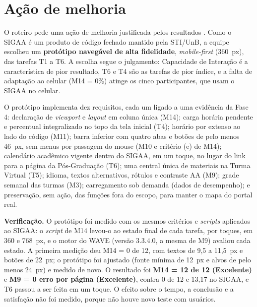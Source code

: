 \section{Ação de melhoria}
\label{sec:melhoria}

O roteiro pede uma ação de melhoria justificada pelos resultados \cite{ramos2026roteiro}. Como o SIGAA é um produto de código fechado mantido pela STI/UnB, a equipe escolheu um \textbf{protótipo navegável de alta fidelidade}, \textit{mobile-first} (360~px), das tarefas T1 a T6. A escolha segue o julgamento: Capacidade de Interação é a característica de pior resultado, T6 e T4 são as tarefas de pior índice, e a falta de adaptação ao celular (M14 = 0\%) atinge os cinco participantes, que usam o SIGAA no celular.

O protótipo implementa dez requisitos, cada um ligado a uma evidência da Fase 4: declaração de \textit{viewport} e \textit{layout} em coluna única (M14); carga horária pendente e percentual integralizado no topo da tela inicial (T4); horário por extenso ao lado do código (M11); barra inferior com quatro abas e botões de pelo menos 46~px, sem menus por passagem do mouse (M10 e critério (e) de M14); calendário acadêmico vigente dentro do SIGAA, em um toque, no lugar do link para a página da Pós-Graduação (T6); uma central única de materiais na Turma Virtual (T5); idioma, textos alternativos, rótulos e contraste AA (M9); grade semanal das turmas (M3); carregamento sob demanda (dados de desempenho); e preservação, sem ação, das funções fora do escopo, para manter o mapa do portal real.

\textbf{Verificação.} O protótipo foi medido com os mesmos critérios e \textit{scripts} aplicados ao SIGAA: o \textit{script} de M14 levou-o ao estado final de cada tarefa, por toques, em 360 e 768~px, e o motor do WAVE (versão 3.3.4.0, a mesma de M9) avaliou cada estado. A primeira medição deu M14 = 0 de 12, com textos de 9,5 a 11,5~px e botões de 22~px; o protótipo foi ajustado (fonte mínima de 12~px e alvos de pelo menos 24~px) e medido de novo. O resultado foi \textbf{M14 = 12 de 12 (Excelente)} e \textbf{M9 = 0 erro por página (Excelente)}, contra 0 de 12 e 13,17 no SIGAA, e T6 passou a ser feita em um toque. O efeito sobre o tempo, a conclusão e a satisfação não foi medido, porque não houve novo teste com usuários.
